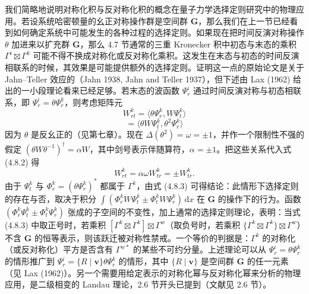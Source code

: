 我们简略地说明对称化积与反对称化积的概念在量子力学选择定则研究中的物理应用。若设系统哈密顿量的幺正对称操作群是空间群 $\mathbf{G}$，那么我们在上一节已经看到如何确定系统中可能发生的各种过程的选择定则。如果现在把时间反演对称操作 $\theta$ 加进来以扩充群 $\mathbf{G}$，那么 4.7 节通常的三重 Kronecker 积中初态与末态的乘积 $\Gamma^{i} \boxtimes \Gamma^{k}$ 可能不得不换成对称化或反对称化乘积。这发生在末态与初态的时间反演相联系的时候，其效果是可能提供额外的选择定则。证明这一点的原始论文是关于 Jahn--Teller 效应的（Jahn 1938, Jahn and Teller 1937），但下述由 Lax (1962) 给出的一小段理论看来已经足够。若末态的波函数 $\Psi^{i}_{r}$ 通过时间反演对称与初态相联系，即 $\Psi^{i}_{r} = \theta\Psi^{k}_{r}$，则考虑矩阵元
\begin{equation*}
W^{k}_{rt} = \langle \theta\Psi^{k}_{r}, W\Psi^{k}_{t}\rangle
\tag{4.8.1}
\end{equation*}
\begin{equation*}
= \langle \theta W\Psi^{k}_{t}, \theta^{2}\Psi^{k}_{r}\rangle
\tag{4.8.2}
\end{equation*}
因为 $\theta$ 是反幺正的（见第七章）。现在 $\Delta(\theta^{2}) = \omega = \pm 1$，并作一个限制性不强的假定 $(\theta W\theta^{-1})^{\dagger} = \alpha W$，其中剑号表示伴随算符，$\alpha = \pm 1$。把这些关系代入式 (4.8.2) 得
\begin{equation*}
W^{k}_{rt} = \alpha\omega W^{k}_{tr} = \pm W^{k}_{tr}.
\tag{4.8.3}
\end{equation*}
由于 $\Psi^{k}_{t}$ 与 $\Phi^{k}_{r} = (\theta\Psi^{k}_{r})^{*}$ 都属于 $\Gamma^{k}$，由式 (4.8.3) 可得结论：此情形下选择定则的存在与否，取决于积分 $\int(\Phi^{k}_{r}W\Psi^{k}_{t} \pm \Phi^{k}_{t}W\Psi^{k}_{r})\,\mathrm{d}x$ 在 $\mathbf{G}$ 的操作下的行为。函数 $(\Phi^{k}_{r}\Psi^{k}_{t} \pm \Phi^{k}_{t}\Psi^{k}_{r})$ 张成的子空间的不变性，加上通常的选择定则理论，表明：当式 (4.8.3) 中取正号时，若乘积 $[\Gamma^{k} \boxtimes \Gamma^{k}] \boxtimes \Gamma^{w}$（取负号时，若乘积 $\{\Gamma^{k} \boxtimes \Gamma^{k}\} \boxtimes \Gamma^{w}$）不含 $\mathbf{G}$ 的恒等表示，则该跃迁被对称性禁戒。一个等价的判据是：$\Gamma^{k}$ 的对称化（或反对称化）平方是否含有 $\Gamma^{w*}$ 的某些不可约分量。上述理论可以从 $\Psi^{i}_{r} = \theta\Psi^{k}_{r}$ 的情形推广到 $\Psi^{i}_{r} = \{R \mid \mathbf{v}\}\theta\Psi^{k}_{r}$ 的情形，其中 $\{R \mid \mathbf{v}\}$ 是空间群 $\mathbf{G}$ 的任一元素（见 Lax (1962)）。另一个需要用给定表示的对称化幂与反对称化幂来分析的物理应用，是二级相变的 Landau 理论，2.6 节开头已提到（文献见 2.6 节）。

